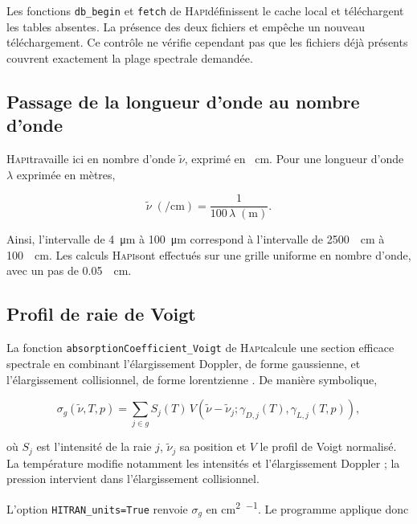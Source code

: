 \documentclass[11pt,a4paper]{article}
\newcommand{\HAPI}{\textsc{Hapi}}
\begin{document}
Les fonctions \texttt{db\_begin} et \texttt{fetch} de \HAPI définissent le
cache local et téléchargent les tables absentes. La présence des deux fichiers
 et  empêche un nouveau téléchargement. Ce contrôle
ne vérifie cependant pas que les fichiers déjà présents couvrent exactement
la plage spectrale demandée.

\subsection{Passage de la longueur d'onde au nombre d'onde}

\HAPI travaille ici en nombre d'onde $\widetilde\nu$, exprimé en
\si{\per\centi\metre}. Pour une longueur d'onde $\lambda$ exprimée en mètres,

\begin{equation}
  \widetilde\nu\;(\si{\per\centi\metre})
  = \frac{1}{100\,\lambda\;(\si{\metre})}.
  \label{eq:conversion_nombre_onde}
\end{equation}

Ainsi, l'intervalle de \SI{4}{\micro\metre} à \SI{100}{\micro\metre}
correspond à l'intervalle de \SI{2500}{\per\centi\metre} à
\SI{100}{\per\centi\metre}. Les calculs \HAPI sont effectués sur une grille
uniforme en nombre d'onde, avec un pas de
\SI{0.05}{\per\centi\metre}.

\subsection{Profil de raie de Voigt}

La fonction \texttt{absorptionCoefficient\_Voigt} de \HAPI calcule une section
efficace spectrale en combinant l'élargissement Doppler, de forme gaussienne,
et l'élargissement collisionnel, de forme lorentzienne
\cite{kochanov2016hapi}. De manière symbolique,

\begin{equation}
  \sigma_g(\widetilde\nu,T,p)
  = \sum_{j\in g} S_j(T)\,
    V\!\left(\widetilde\nu-\widetilde\nu_j;
      \gamma_{D,j}(T),\gamma_{L,j}(T,p)\right),
  \label{eq:section_voigt}
\end{equation}

où $S_j$ est l'intensité de la raie $j$, $\widetilde\nu_j$ sa position et
$V$ le profil de Voigt normalisé. La température modifie notamment les
intensités et l'élargissement Doppler ; la pression intervient dans
l'élargissement collisionnel.

L'option \texttt{HITRAN\_units=True} renvoie $\sigma_g$ en
\si{\centi\metre\squared\per\molecule}. Le programme applique donc
\end{document}
